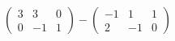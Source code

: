\hspace*{2mm}\begin{minipage}[t]{\dimexpr\linewidth-2mm\relax}\vspace{0pt}
$\begin{pmatrix} 3 & 3 & 0 \\ 0 & -1 & 1 \end{pmatrix}-\begin{pmatrix} -1 & 1 & 1 \\ 2 & -1 & 0 \end{pmatrix}$\end{minipage}
